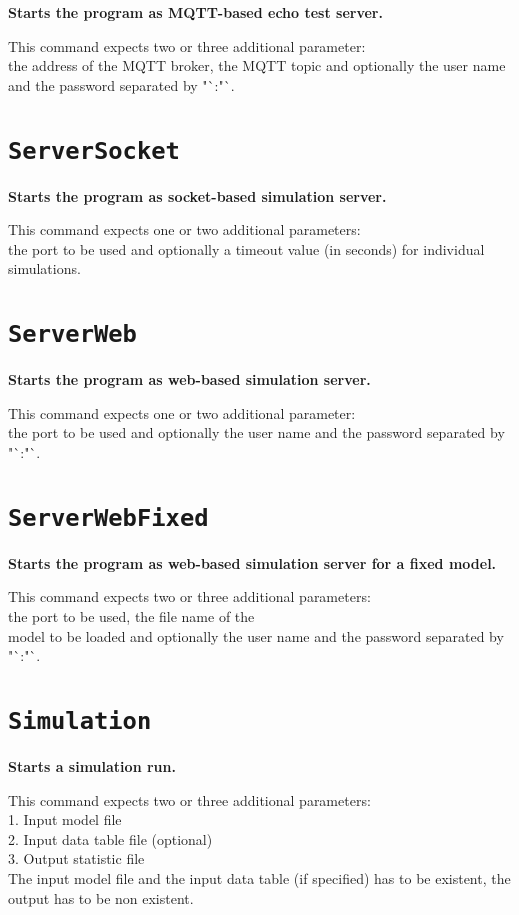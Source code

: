 \textbf{Starts the program as MQTT-based echo test server.}

This command expects two or three additional parameter:\\
the address of the MQTT broker, the MQTT topic and optionally the user name and the password separated by "`:"`.

\section{\texttt{ServerSocket}}

\textbf{Starts the program as socket-based simulation server.}

This command expects one or two additional parameters:\\
the port to be used and optionally a timeout value (in seconds) for individual simulations.

\section{\texttt{ServerWeb}}

\textbf{Starts the program as web-based simulation server.}

This command expects one or two additional parameter:\\
the port to be used and optionally the user name and the password separated by "`:"`.

\section{\texttt{ServerWebFixed}}

\textbf{Starts the program as web-based simulation server for a fixed model.}

This command expects two or three additional parameters:\\
the port to be used, the file name of the\\
model to be loaded and optionally the user name and the password separated by "`:"`.

\section{\texttt{Simulation}}

\textbf{Starts a simulation run.}

This command expects two or three additional parameters:\\
1. Input model file\\
2. Input data table file (optional)\\
3. Output statistic file\\
The input model file and the input data table (if specified) has to be existent, the output has to be non existent.

